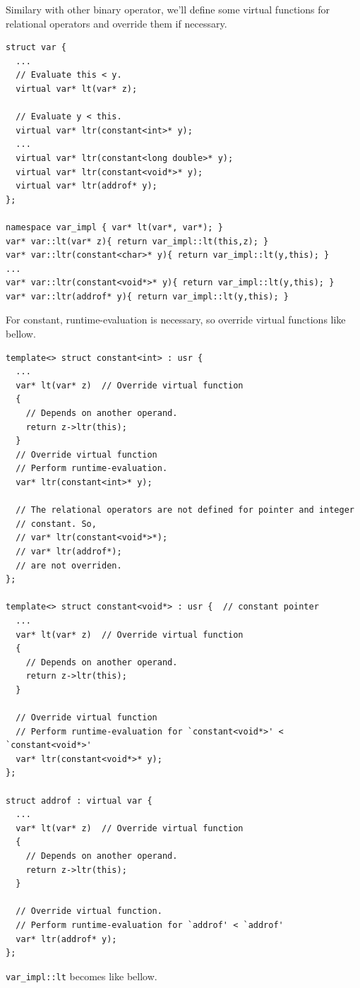 Similary with other binary operator, we'll define some virtual
functions for relational operators and override them if necessary.
\begin{verbatim}
struct var {
  ...
  // Evaluate this < y.
  virtual var* lt(var* z);

  // Evaluate y < this.
  virtual var* ltr(constant<int>* y);
  ...
  virtual var* ltr(constant<long double>* y);
  virtual var* ltr(constant<void*>* y);
  virtual var* ltr(addrof* y);
};

namespace var_impl { var* lt(var*, var*); }
var* var::lt(var* z){ return var_impl::lt(this,z); }
var* var::ltr(constant<char>* y){ return var_impl::lt(y,this); }
...
var* var::ltr(constant<void*>* y){ return var_impl::lt(y,this); }
var* var::ltr(addrof* y){ return var_impl::lt(y,this); }
\end{verbatim}
For constant, runtime-evaluation is necessary, so override
virtual functions like bellow.
\begin{verbatim}
template<> struct constant<int> : usr {
  ...
  var* lt(var* z)  // Override virtual function
  {
    // Depends on another operand.
    return z->ltr(this);
  }
  // Override virtual function
  // Perform runtime-evaluation.
  var* ltr(constant<int>* y);

  // The relational operators are not defined for pointer and integer
  // constant. So,
  // var* ltr(constant<void*>*);
  // var* ltr(addrof*);
  // are not overriden.
};

template<> struct constant<void*> : usr {  // constant pointer
  ...
  var* lt(var* z)  // Override virtual function
  {
    // Depends on another operand.
    return z->ltr(this);
  }

  // Override virtual function
  // Perform runtime-evaluation for `constant<void*>' < `constant<void*>'
  var* ltr(constant<void*>* y);
};

struct addrof : virtual var {
  ...
  var* lt(var* z)  // Override virtual function
  {
    // Depends on another operand.
    return z->ltr(this);
  }

  // Override virtual function.
  // Perform runtime-evaluation for `addrof' < `addrof'
  var* ltr(addrof* y);
};
\end{verbatim}
{\tt{var\_impl::lt}} becomes like bellow.
